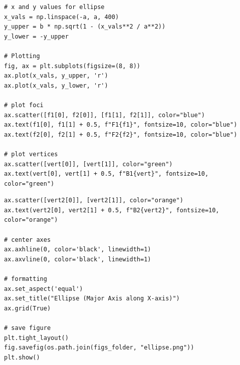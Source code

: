 \documentclass{beamer}
\theoremstyle{remark}
\numberwithin{equation}{section}
\begin{document}
\begin{frame}[fragile]
\begin{lstlisting}
# x and y values for ellipse
x_vals = np.linspace(-a, a, 400)
y_upper = b * np.sqrt(1 - (x_vals**2 / a**2))
y_lower = -y_upper

# Plotting
fig, ax = plt.subplots(figsize=(8, 8))
ax.plot(x_vals, y_upper, 'r')
ax.plot(x_vals, y_lower, 'r')

# plot foci
ax.scatter([f1[0], f2[0]], [f1[1], f2[1]], color="blue")
ax.text(f1[0], f1[1] + 0.5, f"F1{f1}", fontsize=10, color="blue")
ax.text(f2[0], f2[1] + 0.5, f"F2{f2}", fontsize=10, color="blue")

# plot vertices
ax.scatter([vert[0]], [vert[1]], color="green")
ax.text(vert[0], vert[1] + 0.5, f"B1{vert}", fontsize=10, color="green")
\end{lstlisting}
\end{frame}
\begin{frame}[fragile]
\begin{lstlisting}
ax.scatter([vert2[0]], [vert2[1]], color="orange")
ax.text(vert2[0], vert2[1] + 0.5, f"B2{vert2}", fontsize=10, color="orange")

# center axes
ax.axhline(0, color='black', linewidth=1)
ax.axvline(0, color='black', linewidth=1)

# formatting
ax.set_aspect('equal')
ax.set_title("Ellipse (Major Axis along X-axis)")
ax.grid(True)

# save figure
plt.tight_layout()
fig.savefig(os.path.join(figs_folder, "ellipse.png"))
plt.show()

\end{lstlisting}
\end{frame}
\end{document}
